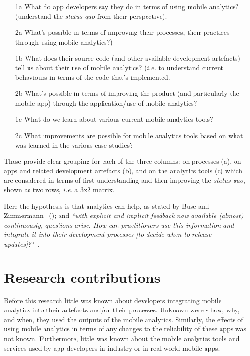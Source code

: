\begin{enumerate}
    \item [1a] What do app developers say they do in terms of using mobile analytics? (understand the \emph{status quo} from their perspective).
    \item [2a] What's possible in terms of improving their processes, their practices through using mobile analytics?)
    \item [1b] What does their source code (and other available development artefacts) tell us about their use of mobile analytics? (\emph{i.e.} to understand current behaviours in terms of the code that's implemented.
    \item [2b] What's possible in terms of improving the product (and particularly the mobile app) through the application/use of mobile analytics?
    \item [1c] What do we learn about various current mobile analytics tools?
    \item [2c] What improvements are possible for mobile analytics tools based on what was learned in the various case studies?
\end{enumerate}

These provide clear grouping for each of the three columns: on processes (a), on apps and related development artefacts (b), and on the analytics tools (c) which are considered in terms of first understanding and then improving the \emph{status-quo}, shown as two rows, \emph{i.e.} a 3x2 matrix. 


Here the hypothesis is that analytics can help, as stated by Buse and Zimmermann ~(\citeyear{buse_analytics_2010}); and \emph{``with explicit and implicit feedback now available (almost) continuously, questions arise. How can practitioners use this information and integrate it into their development processes [to decide when to release updates]?"}~.


\section{Research contributions}
Before this research little was known about developers integrating mobile analytics into their artefacts and/or their processes. Unknown were - how, why, and when, they used the outputs of the mobile analytics. Similarly, the effects of using mobile analytics in terms of any changes to the reliability of these apps was not known. Furthermore, little was known about the mobile analytics tools and services used by app developers in industry or in real-world mobile apps.


